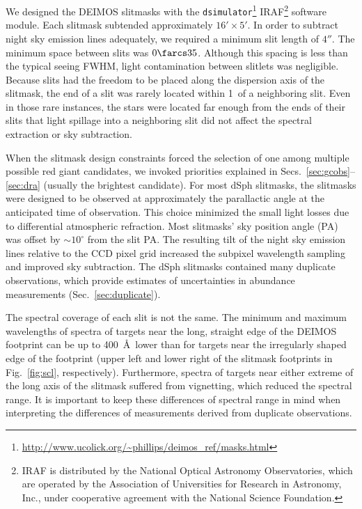 \documentclass{emulateapj}
\begin{document}
We designed the DEIMOS slitmasks with the
\texttt{dsimulator}\footnote{\url{http://www.ucolick.org/~phillips/deimos_ref/masks.html}}
IRAF\footnote{IRAF is distributed by the National Optical Astronomy
  Observatories, which are operated by the Association of Universities
  for Research in Astronomy, Inc., under cooperative agreement with
  the National Science Foundation.} software module.  Each slitmask
subtended approximately $16' \times 5'$.  In order to subtract night
sky emission lines adequately, we required a minimum slit length of
$4''$.  The minimum space between slits was $0 \farcs 35$.  Although
this spacing is less than the typical seeing FWHM, light contamination
between slitlets was negligible.  Because slits had the freedom to be
placed along the dispersion axis of the slitmask, the end of a slit
was rarely located within 1\arcsec\ of a neighboring slit.  Even in
those rare instances, the stars were located far enough from the ends
of their slits that light spillage into a neighboring slit did not
affect the spectral extraction or sky subtraction.

When the slitmask design constraints forced the selection of one among
multiple possible red giant candidates, we invoked priorities
explained in Secs.~\ref{sec:gcobs}--\ref{sec:dra} (usually the
brightest candidate).  For most dSph slitmasks, the slitmasks were
designed to be observed at approximately the parallactic angle at the
anticipated time of observation.  This choice minimized the small
light losses due to differential atmospheric refraction.  Most
slitmasks' sky position angle (PA) was offset by $\sim 10^{\circ}$
from the slit PA.  The resulting tilt of the night sky emission lines
relative to the CCD pixel grid increased the subpixel wavelength
sampling and improved sky subtraction.  The dSph slitmasks contained
many duplicate observations, which provide estimates of uncertainties
in abundance measurements (Sec.~\ref{sec:duplicate}).

The spectral coverage of each slit is not the same.  The minimum and
maximum wavelengths of spectra of targets near the long, straight edge
of the DEIMOS footprint can be up to 400~\AA\ lower than for targets
near the irregularly shaped edge of the footprint (upper left and
lower right of the slitmask footprints in Fig.~\ref{fig:scl},
respectively).  Furthermore, spectra of targets near either extreme of
the long axis of the slitmask suffered from vignetting, which reduced
the spectral range.  It is important to keep these differences of
spectral range in mind when interpreting the differences of
measurements derived from duplicate observations.
\end{document}
